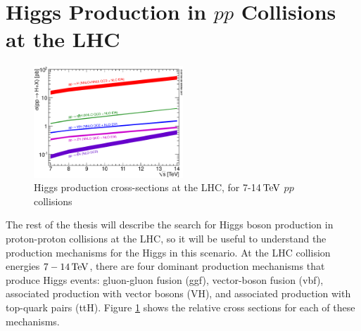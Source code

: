 \section{Higgs Production in $pp$ Collisions at the LHC}
\label{higgs_production_overview}

\begin{figure}[h]
   \centering
  \includegraphics[width=0.5\textwidth]{Figures/Experimental_Results/Higgs_XS_7-14TeV.eps}
  \caption{Higgs production cross-sections at the LHC, for 7-14$\,\text{Te\hspace{-.08em}V}$
    $pp$ collisions} \label{fig:Higgs_XS_7-14TeV}
\end{figure}

\par The rest of the thesis will describe the search for Higgs
boson production in proton-proton collisions at the LHC, so it will be
useful to understand the production mechanisms for the Higgs in this
scenario.  At the LHC collision energies $7-14\,\text{Te\hspace{-.08em}V}$, there are four
dominant production mechanisms that produce Higgs events: gluon-gluon
fusion (ggf), vector-boson fusion (vbf), associated production with
vector bosons (VH), and associated production with top-quark pairs (ttH).  Figure
\ref{fig:Higgs_XS_7-14TeV} shows the relative cross sections for each
of these mechanisms.  


